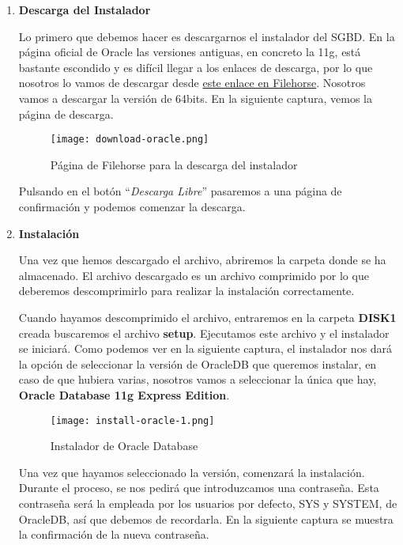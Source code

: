 \begin{enumerate}
    \item \textbf{Descarga del Instalador}

    Lo primero que debemos hacer es descargarnos el instalador del SGBD. En la página oficial de Oracle las versiones antiguas, en concreto la 11g, está bastante escondido y es difícil llegar a los enlaces de descarga, por lo que nosotros lo vamos de descargar desde \href{https://www.filehorse.com/es/descargar-oracle-database-express/}{este enlace en Filehorse}. Nosotros vamos a descargar la versión de 64bits. En la siguiente captura, vemos la página de descarga.

    \begin{figure}[ht]
        \centering
        \texttt{[image: download-oracle.png]}
        \caption{Página de Filehorse para la descarga del instalador}
    \end{figure}

    Pulsando en el botón ``\textit{Descarga Libre}'' pasaremos a una página de confirmación y podemos comenzar la descarga.

    \item \textbf{Instalación}

    Una vez que hemos descargado el archivo, abriremos la carpeta donde se ha almacenado. El archivo descargado es un archivo comprimido por lo que deberemos descomprimirlo para realizar la instalación correctamente.

    Cuando hayamos descomprimido el archivo, entraremos en la carpeta \textbf{DISK1} creada buscaremos el archivo \textbf{setup}. Ejecutamos este archivo y el instalador se iniciará. Como podemos ver en la siguiente captura, el instalador nos dará la opción de seleccionar la versión de OracleDB que queremos instalar, en caso de que hubiera varias, nosotros vamos a seleccionar la única que hay, \textbf{Oracle Database 11g Express Edition}.

    \newpage

    \begin{figure}[ht]
        \centering
        \texttt{[image: install-oracle-1.png]}
        \caption{Instalador de Oracle Database}
    \end{figure}

    Una vez que hayamos seleccionado la versión, comenzará la instalación. Durante el proceso, se nos pedirá que introduzcamos una contraseña. Esta contraseña será la empleada por los usuarios por defecto, SYS y SYSTEM, de OracleDB, así que debemos de recordarla. En la siguiente captura se muestra la confirmación de la nueva contraseña.


\end{enumerate}
